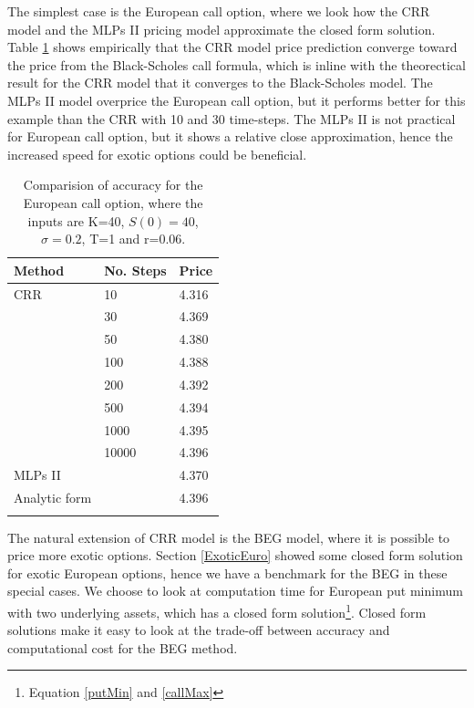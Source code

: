 The simplest case is the European call option, where we look how the CRR model and the MLPs II pricing model approximate the closed form solution. Table \ref{tab:EuroCall} shows empirically that the CRR model price prediction converge toward the price from the Black-Scholes call formula, which is inline with the theorectical result for the CRR model that it converges to the Black-Scholes model. The MLPs II model overprice the European call option, but it performs better for this example than the CRR with 10 and 30 time-steps. The MLPs II is not practical for European call option, but it shows a relative close approximation, hence the increased speed for exotic options could be beneficial.\\

\begin{table}[th]
\caption{Comparision of accuracy for the European call option, where the inputs are K=40, $S(0)=40$, $\sigma=0.2$, T=1 and r=0.06.}
\label{tab:EuroCall}
\centering
\begin{tabular}{l l l}
\toprule
\textbf{Method} & \textbf{No. Steps} & \textbf{Price} \\
\midrule
CRR & 10 & 4.316\\
& 30 & 4.369\\
& 50 & 	4.380\\
& 100 & 4.388\\
& 200 & 4.392\\
& 500 & 4.394\\
& 1000 & 4.395\\
& 10000 & 4.396\\
MLPs II & & 4.370\\
Analytic form & & 4.396\\
\bottomrule\\
\end{tabular}
\end{table}

The natural extension of CRR model is the BEG model, where it is possible to price more exotic options. Section \ref{ExoticEuro} showed some closed form solution for exotic European options, hence we have a benchmark for the BEG in these special cases. We choose to look at computation time for European put minimum with two underlying assets, which has a closed form solution\footnote{Equation \eqref{putMin} and \eqref{callMax}}. Closed form solutions make it easy to look at the trade-off between accuracy and computational cost for the BEG method. \\

